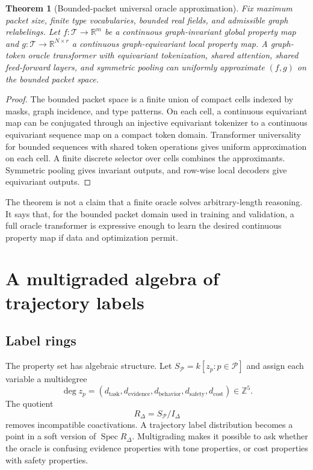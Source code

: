 \documentclass[11pt]{article}
\newtheorem{theorem}{Theorem}[section]
\newcommand{\RR}{\mathbb{R}}
\newcommand{\ZZ}{\mathbb{Z}}
\newcommand{\calP}{\mathcal{P}}
\newcommand{\calT}{\mathcal{T}}
\newcommand{\Spec}{\operatorname{Spec}}
\numberwithin{equation}{section}
\begin{document}
\begin{theorem}[Bounded-packet universal oracle approximation]
Fix maximum packet size, finite type vocabularies, bounded real fields, and admissible graph relabelings. Let $f:\calT\to\RR^m$ be a continuous graph-invariant global property map and $g:\calT\to\RR^{N\times r}$ a continuous graph-equivariant local property map. A graph-token oracle transformer with equivariant tokenization, shared attention, shared feed-forward layers, and symmetric pooling can uniformly approximate $(f,g)$ on the bounded packet space.
\end{theorem}
\begin{proof}
The bounded packet space is a finite union of compact cells indexed by masks, graph incidence, and type patterns. On each cell, a continuous equivariant map can be conjugated through an injective equivariant tokenizer to a continuous equivariant sequence map on a compact token domain. Transformer universality for bounded sequences with shared token operations gives uniform approximation on each cell. A finite discrete selector over cells combines the approximants. Symmetric pooling gives invariant outputs, and row-wise local decoders give equivariant outputs.
\end{proof}

The theorem is not a claim that a finite oracle solves arbitrary-length reasoning. It says that, for the bounded packet domain used in training and validation, a full oracle transformer is expressive enough to learn the desired continuous property map if data and optimization permit.

\section{A multigraded algebra of trajectory labels}
\subsection{Label rings}
The property set has algebraic structure. Let $S_\calP=k[z_p:p\in\calP]$ and assign each variable a multidegree
\begin{equation}
\deg z_p=(d_{\mathrm{task}},d_{\mathrm{evidence}},d_{\mathrm{behavior}},d_{\mathrm{safety}},d_{\mathrm{cost}})\in\ZZ^5.
\end{equation}
The quotient
\begin{equation}
R_\Delta=S_\calP/I_\Delta
\end{equation}
removes incompatible coactivations. A trajectory label distribution becomes a point in a soft version of $\Spec R_\Delta$. Multigrading makes it possible to ask whether the oracle is confusing evidence properties with tone properties, or cost properties with safety properties.
\end{document}
